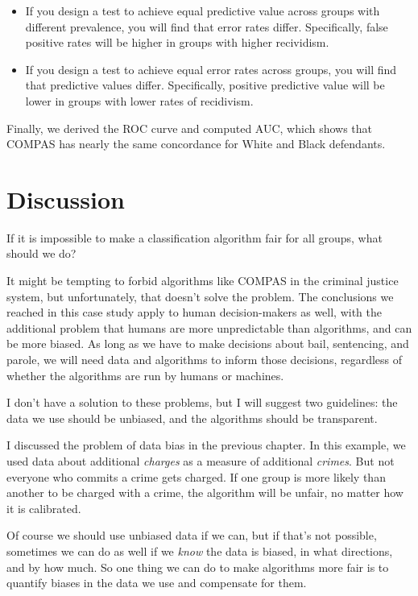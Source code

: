 \begin{itemize}
\item
  If you design a test to achieve equal predictive value across groups
  with different prevalence, you will find that error rates differ.
  Specifically, false positive rates will be higher in groups with
  higher recividism.
\item
  If you design a test to achieve equal error rates across groups, you
  will find that predictive values differ. Specifically, positive
  predictive value will be lower in groups with lower rates of
  recidivism.
\end{itemize}

Finally, we derived the ROC curve and computed AUC, which shows that
COMPAS has nearly the same concordance for White and Black defendants.

\section{Discussion}\label{discussion}

If it is impossible to make a classification algorithm fair for all
groups, what should we do?

It might be tempting to forbid algorithms like COMPAS in the criminal
justice system, but unfortunately, that doesn't solve the problem. The
conclusions we reached in this case study apply to human decision-makers
as well, with the additional problem that humans are more unpredictable
than algorithms, and can be more biased. As long as we have to make
decisions about bail, sentencing, and parole, we will need data and
algorithms to inform those decisions, regardless of whether the
algorithms are run by humans or machines.

I don't have a solution to these problems, but I will suggest two
guidelines: the data we use should be unbiased, and the algorithms
should be transparent.

I discussed the problem of data bias in the previous chapter. In this
example, we used data about additional \emph{charges} as a measure of
additional \emph{crimes}. But not everyone who commits a crime gets
charged. If one group is more likely than another to be charged with a
crime, the algorithm will be unfair, no matter how it is calibrated.

Of course we should use unbiased data if we can, but if that's not
possible, sometimes we can do as well if we \emph{know} the data is
biased, in what directions, and by how much. So one thing we can do to
make algorithms more fair is to quantify biases in the data we use and
compensate for them.

